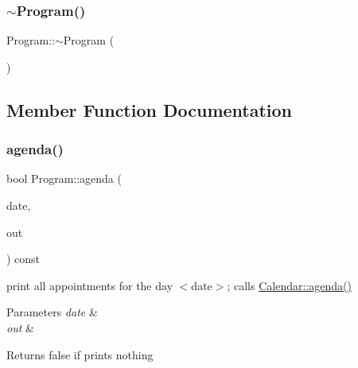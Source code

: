 \mbox{\label{classProgram_a986aef1c50e1d338a3315a47ba6df549}} 
\subsubsection{\texorpdfstring{$\sim$\+Program()}{~Program()}}
{\footnotesize\ttfamily Program\+::$\sim$\+Program (\begin{DoxyParamCaption}{ }\end{DoxyParamCaption})}



\subsection{Member Function Documentation}
\mbox{\label{classProgram_a36916661bfce488ed07dbc2a7f3fadce}} 
\subsubsection{\texorpdfstring{agenda()}{agenda()}}
{\footnotesize\ttfamily bool Program\+::agenda (\begin{DoxyParamCaption}\item[{\hyperlink{classDate}{Date} const \&}]{date,  }\item[{\hyperlink{doctest_8h_a116af65cb5e924b33ad9d9ecd7a783f3}{std\+::ostream} \&}]{out }\end{DoxyParamCaption}) const}

print all appointments for the day $<$date$>$; calls \hyperlink{classCalendar_ac6112aa4e9b3e6e5b9a478ff66789d77}{Calendar\+::agenda()} 
\begin{DoxyParams}{Parameters}
{\em date} & \\
\hline
{\em out} & \\
\hline
\end{DoxyParams}
\begin{DoxyReturn}{Returns}
false if prints nothing 
\end{DoxyReturn}
\mbox{\label{classProgram_a3fd5b4cf3d1eaa58809f593ccdc7a2d3}} 
